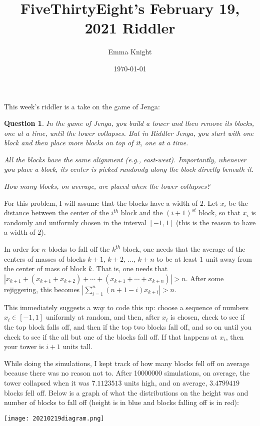 \documentclass[11pt]{article}
\title{FiveThirtyEight's February 19, 2021 Riddler}
\author{Emma Knight}
\date{\today}
\newtheorem{question}[theorem]{Question}
\theoremstyle{definition}
\begin{document}
\maketitle
This week's riddler is a take on the game of Jenga:
\begin{question}
In the game of Jenga, you build a tower and then remove its blocks, one at a time, until the tower collapses. But in Riddler Jenga, you start with one block and then place more blocks on top of it, one at a time.

All the blocks have the same alignment (e.g., east-west). Importantly, whenever you place a block, its center is picked randomly along the block directly beneath it.

How many blocks, on average, are placed when the tower collapses?
\end{question}

For this problem, I will assume that the blocks have a width of $2$.  Let $x_i$ be the distance between the center of the $i^{th}$ block and the $(i+1)^{st}$ block, so that $x_i$ is randomly and uniformly chosen in the interval $[-1,1]$ (this is the reason to have a width of $2$).

In order for $n$ blocks to fall off the $k^{th}$ block, one needs that the average of the centers of masses of blocks $k+1$, $k+2$, ..., $k+n$ to be at least $1$ unit away from the center of mass of block $k$.  That is, one needs that $|x_{k+1} + (x_{k+1} + x_{k+2}) + \cdots + (x_{k+1} + \cdots + x_{k+n})| > n$.  After some rejiggering, this becomes $\left|\sum_{i=1}^{n} (n+1-i)x_{k+i}\right| > n$.

This immediately suggests a way to code this up: choose a sequence of numbers $x_i \in [-1, 1]$ uniformly at random, and then, after $x_i$ is chosen, check to see if the top block falls off, and then if the top two blocks fall off, and so on until you check to see if the all but one of the blocks fall off.  If that happens at $x_i$, then your tower is $i+1$ units tall.

While doing the simulations, I kept track of how many blocks fell off on average because there was no reason not to.  After 10000000 simulations, on average, the tower collapsed when it was $7.1123513$ units high, and on average, $3.4799419$ blocks fell off.  Below is a graph of what the distributions on the height was and number of blocks to fall off (height is in blue and blocks falling off is in red):

\texttt{[image: 20210219diagram.png]}
\end{document}
